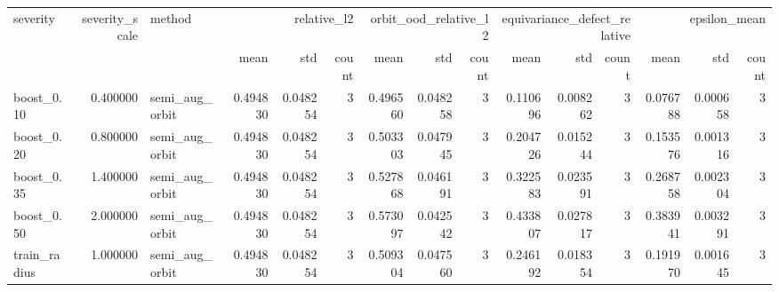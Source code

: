\begin{tabular}{lrlrrrrrrrrrrrr}
\toprule
severity & severity_scale & method & \multicolumn{3}{r}{relative_l2} & \multicolumn{3}{r}{orbit_ood_relative_l2} & \multicolumn{3}{r}{equivariance_defect_relative} & \multicolumn{3}{r}{epsilon_mean} \\
 &  &  & mean & std & count & mean & std & count & mean & std & count & mean & std & count \\
\midrule
boost_0.10 & 0.400000 & semi_aug_orbit & 0.494830 & 0.048254 & 3 & 0.496560 & 0.048258 & 3 & 0.110696 & 0.008262 & 3 & 0.076788 & 0.000658 & 3 \\
boost_0.20 & 0.800000 & semi_aug_orbit & 0.494830 & 0.048254 & 3 & 0.503303 & 0.047945 & 3 & 0.204726 & 0.015244 & 3 & 0.153576 & 0.001316 & 3 \\
boost_0.35 & 1.400000 & semi_aug_orbit & 0.494830 & 0.048254 & 3 & 0.527868 & 0.046191 & 3 & 0.322583 & 0.023591 & 3 & 0.268758 & 0.002304 & 3 \\
boost_0.50 & 2.000000 & semi_aug_orbit & 0.494830 & 0.048254 & 3 & 0.573097 & 0.042542 & 3 & 0.433807 & 0.027817 & 3 & 0.383941 & 0.003291 & 3 \\
train_radius & 1.000000 & semi_aug_orbit & 0.494830 & 0.048254 & 3 & 0.509304 & 0.047560 & 3 & 0.246192 & 0.018354 & 3 & 0.191970 & 0.001645 & 3 \\
\bottomrule
\end{tabular}
